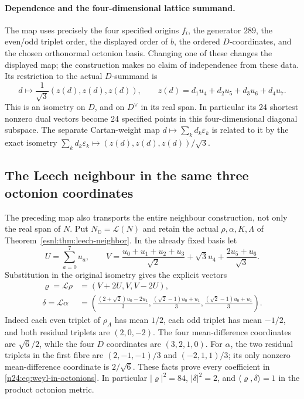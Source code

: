 \paragraph{Dependence and the four-dimensional lattice summand.}
The map uses precisely the four specified origins \(f_i\), the
generator \(289\), the even/odd triplet order, the displayed order
of \(b\), the ordered \(D\)-coordinates, and the chosen orthonormal
octonion basis.  Changing one of these changes the displayed map;
the construction makes no claim of independence from these data.
Its restriction to the actual \(D\)-summand is
\begin{equation}
 d\longmapsto\frac1{\sqrt3}(z(d),z(d),z(d)),\qquad
 z(d)=d_1u_4+d_2u_5+d_3u_6+d_4u_7.
 \label{n24:eq:d-diagonal-embedding}
\end{equation}
This is an isometry on \(D\), and on \(D^\vee\) in its real span.
In particular its 24 shortest nonzero dual vectors become 24
specified points in this four-dimensional diagonal subspace.
The separate Cartan-weight map \(d\mapsto\sum_kd_k\varepsilon_k\)
is related to it by the exact isometry
\(\sum_kd_k\varepsilon_k\mapsto(z(d),z(d),z(d))/\sqrt3\).

\subsection{The Leech neighbour in the same three octonion coordinates}
\label{n24:sec:leech-coordinates}

The preceding map also transports the entire neighbour construction,
not only the real span of $N$. Put $N_{\mathbb O}=\mathcal L(N)$ and
retain the actual $\rho,\alpha,K,\Lambda$ of
Theorem~\ref{esnl:thm:leech-neighbor}. In the already fixed basis let
\[
 U=\sum_{a=0}^7u_a,\qquad
 V=\frac{u_0+u_1+u_2+u_3}{\sqrt2}
       +\sqrt3u_4+\frac{2u_5+u_6}{\sqrt3}.
\]
Substitution in the original isometry gives the explicit vectors
\begin{equation}
 \begin{aligned}
 \varrho=\mathcal L\rho&=(V+2U,V,V-2U),\\
 \delta=\mathcal L\alpha
 &=\left(\frac{(2+\sqrt2)u_0-2u_1}{3},
          \frac{(\sqrt2-1)u_0+u_1}{3},
          \frac{(\sqrt2-1)u_0+u_1}{3}\right).
 \end{aligned}
 \label{n24:eq:weyl-in-octonions}
\end{equation}
Indeed each even triplet of $\rho_A$ has mean $1/2$, each odd
triplet has mean $-1/2$, and both residual triplets are $(2,0,-2)$.
The four mean-difference coordinates are $\sqrt6/2$, while the
four $D$ coordinates are $(3,2,1,0)$. For $\alpha$, the two residual
triplets in the first fibre are $(2,-1,-1)/3$ and $(-2,1,1)/3$;
its only nonzero mean-difference coordinate is $2/\sqrt6$.
These facts prove every coefficient in
\eqref{n24:eq:weyl-in-octonions}. In particular
$|\varrho|^2=84$, $|\delta|^2=2$, and
$\langle\varrho,\delta\rangle=1$ in the product octonion metric.

